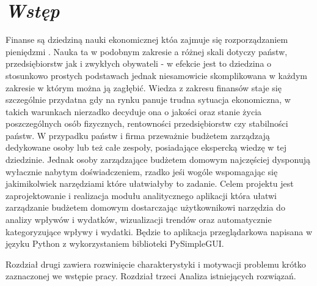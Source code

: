 \documentclass[a4paper,10pt, twoside]{report}
\newcommand{\customstylechapter}[1]{\large{\textit{#1}}}
\begin{document}
\null\newpage %

\renewcommand*\contentsname{Spis treści}
\tableofcontents                    %




\chapter{\customstylechapter{Wstęp}}
{Finanse są dziedziną nauki ekonomicznej któa zajmuje się rozporządzaniem 
pieniędzmi \cite{wiki_ekonomia}. Nauka ta w podobnym zakresie a różnej skali 
dotyczy państw, przedsiębiorstw jak i zwykłych obywateli - w efekcie jest to 
dziedzina o stosunkowo prostych podstawach jednak niesamowicie skomplikowana w 
każdym zakresie w którym można ją zagłębić. Wiedza z zakresu finansów staje się 
szczególnie przydatna gdy na rynku panuje trudna sytuacja ekonomiczna, w takich 
warunkach nierzadko decyduje ona o jakości oraz stanie życia poszczególnych 
osób fizycznych, rentowności przedsiębiorstw czy stabilności państw. W przypadku
 państw i firma przeważnie budżetem zarządzają dedykowane osoby lub też całe 
zespoły, posiadające ekspercką wiedzę w tej dziedzinie. Jednak osoby 
zarządzające budżetem domowym najczęściej dysponują wyłacznie nabytym 
doświadczeniem, rzadko jeśi wogóle wspomagając się jakimikolwiek narzędziami 
które ułatwiałyby to zadanie.}
%
{Celem projektu jest zaprojektowanie i realizacja modułu analitycznego aplikacji 
która ułatwi zarządzanie budżetem domowym dostarczając użytkownikowi narzędzia 
do analizy wpływów i wydatków, wizualizacji trendów oraz automatycznie 
kategoryzujące wpływy i wydatki. Będzie to aplikacja przeglądarkowa napisana w 
języku Python z wykorzystaniem biblioteki PySimpleGUI\cite{PySimpleGUI}.}

{Rozdział drugi zawiera rozwinięcie charakterystyki i motywacji problemu krótko 
zaznaczonej we wstępie pracy. Rozdział trzeci Analiza istniejących rozwiązań. }

\end{document}
